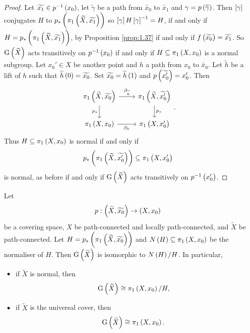 \begin{proof}
Let $ \widetilde{x_1} \in p^{-1}\br{x_0} $, let $ \widetilde{\gamma} $ be a path from $ \widetilde{x_0} $ to $ \widetilde{x_1} $ and $ \gamma = p\br{\widetilde{\gamma}} $. Then $ \sbr{\gamma} $ conjugates $ H $ to $ p_*\br{\pi_1\br{\widetilde{X}, \widetilde{x_1}}} $ so $ \sbr{\gamma}H\sbr{\gamma}^{-1} = H $, if and only if $ H = p_*\br{\pi_1\br{\widetilde{X}, \widetilde{x_1}}} $, by Proposition \ref{prop:1.37} if and only if $ f\br{\widetilde{x_0}} = \widetilde{x_1} $. So $ \G\br{\widetilde{X}} $ acts transitively on $ p^{-1}\br{x_0} $ if and only if $ H \subseteq \pi_1\br{X, x_0} $ is a normal subgroup. Let $ x_0' \in X $ be another point and $ h $ a path from $ x_0 $ to $ \widetilde{x_0} $. Let $ \widetilde{h} $ be a lift of $ h $ such that $ \widetilde{h}\br{0} = \widetilde{x_0} $. Set $ \widetilde{x_0} = \widetilde{h}\br{1} $ and $ p\br{\widetilde{x_0'}} = x_0' $. Then
$$
\begin{tikzcd}
\pi_1\br{\widetilde{X}, \widetilde{x_0}} \arrow{r}{\beta_{\widetilde{h}}} \arrow[swap]{d}{p_*} & \pi_1\br{\widetilde{X}, \widetilde{x_0'}} \arrow{d}{p_*} \\
\pi_1\br{X, x_0} \arrow[swap]{r}{\beta_h} & \pi_1\br{X, x_0'}
\end{tikzcd}.
$$
Thus $ H \subseteq \pi_1\br{X, x_0} $ is normal if and only if
$$ p_*\br{\pi_1\br{\widetilde{X}, \widetilde{x_0'}}} \subseteq \pi_1\br{X, x_0'} $$ is normal, as before if and only if $ \G\br{\widetilde{X}} $ acts transitively on $ p^{-1}\br{x_0'} $.
\end{proof}


\begin{proposition}
Let
$$ p : \br{\widetilde{X}, \widetilde{x_0}} \to \br{X, x_0} $$
be a covering space, $ X $ be path-connected and locally path-connected, and $ \widetilde{X} $ be path-connected. Let $ H = p_*\br{\pi_1\br{\widetilde{X}, \widetilde{x_0}}} $ and $ N\br{H} \subseteq \pi_1\br{X, x_0} $ be the normaliser of $ H $. Then $ \G\br{\widetilde{X}} $ is isomorphic to $ N\br{H} / H $. In particular,
\begin{itemize}
\item if $ \widetilde{X} $ is normal, then
$$ \G\br{\widetilde{X}} \cong \pi_1\br{X, x_0} / H, $$
\item if $ \widetilde{X} $ is the universal cover, then
$$ \G\br{\widetilde{X}} \cong \pi_1\br{X, x_0}. $$
\end{itemize}
\end{proposition}

